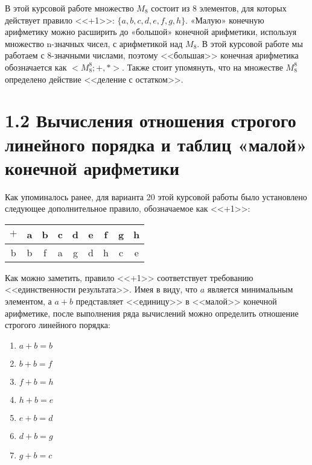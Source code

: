 \documentclass[10pt,a4paper,final]{article} %
\begin{document}
	В этой курсовой работе множество $M_{8}$ состоит из 8 элементов, для которых действует правило <<+1>>: $\{a, b, c, d, e, f, g, h\}$. «Малую» конечную арифметику можно расширить до «большой» конечной арифметики, используя
	множество n-значных чисел, с арифметикой над $M_{8}$. В этой курсовой работе мы работаем с 8-значными числами, поэтому <<большая>> конечная арифметика обозначается как $<M_{8}^{8} ;+, *>$. Также стоит упомянуть, что на множестве $M_{8}^{8}$ определено действие <<деление с остатком>>.
	
	\section*{1.2 Вычисления отношения строгого линейного порядка и таблиц «малой» конечной арифметики}
	
	Как упоминалось ранее, для варианта 20 этой курсовой работы было установлено следующее дополнительное правило, обозначаемое как <<+1>>:
	
	\begin{table}[h]
		\hspace{5em} %
		\centering
		\begin{minipage}{.5\textwidth}
			\centering
			\begin{tabular}{c|c c c c c c c c}
				$+$ & a & b & c & d & e & f & g & h \\
				\hline
				b & b & f & a & g & d & h & c & e \\
			\end{tabular}
			
		\end{minipage}
	\end{table}
	
	Как можно заметить, правило <<+1>> соответствует требованию <<единственности результата>>. Имея в виду, что \( a \) является минимальным элементом, а \( a + b \) представляет <<единицу>> в <<малой>> конечной арифметике, после выполнения ряда вычислений можно определить отношение строгого линейного порядка:
	
	\begin{enumerate}
		\item $a+b=b$
		\item $b+b=f$
		\item $f+b=h$
		\item $h+b=e$
		\item $e+b=d$
		\item $d+b=g$
		\item $g+b=c$
	\end{enumerate}
	
\end{document}
